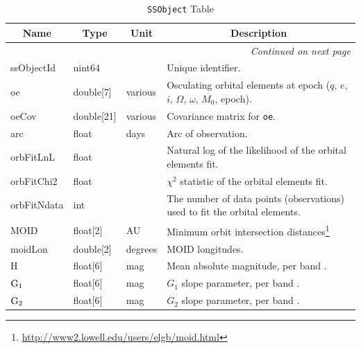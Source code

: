 \documentclass[12pt]{article}
\newcommand{\code}[1]{\texttt{#1}}
\newcommand{\SSObject}{\code{SSObject}\xspace}
\begin{document}
\begin{center}
\begin{longtable}{p{3cm}p{2cm}p{2cm}p{5cm}}
\caption[\SSObject Table]{\SSObject Table} \\

\hline \multicolumn{1}{c}{\bf Name} & \multicolumn{1}{c}{\bf Type} & \multicolumn{1}{c}{\bf Unit} & \multicolumn{1}{c}{\bf Description} \\ \hline
\endhead

\hline \multicolumn{4}{r}{{\em Continued on next page}} \\
\endfoot

\hline\hline
\endlastfoot

ssObjectId & uint64 & ~ & Unique identifier. \\

oe & double[7] & various & Osculating orbital elements at epoch ($q$, $e$, $i$, $\Omega$, $\omega$, $M_0$, epoch). \\

oeCov & double[21] & various & Covariance matrix for \texttt{oe}. \\

arc & float & days & Arc of observation. \\

orbFitLnL & float & ~ & Natural log of the likelihood of the orbital elements fit. \\

orbFitChi2 & float & ~ & $\chi^2$ statistic of the orbital elements fit. \\

orbFitNdata & int & ~ & The number of data points (observations) used to fit the orbital elements. \\

MOID & float[2] & AU & Minimum orbit intersection distances\footnote{\url{http://www2.lowell.edu/users/elgb/moid.html}} \\

moidLon & double[2] & degrees & MOID longitudes. \\

H & float[6] & mag & Mean absolute magnitude, per band \citep[][magnitude-phase system]{2010Icar..209..542M}. \\

${\rm G_1}$ & float[6] & mag & $G_1$ slope parameter, per band \citep[][magnitude-phase system]{2010Icar..209..542M}. \\

${\rm G_2}$ & float[6] & mag & $G_2$ slope parameter, per band \citep[][magnitude-phase system]{2010Icar..209..542M}. \\


\end{longtable}
\end{center}
\end{document}
